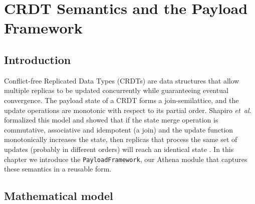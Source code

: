 

\newcommand{\AthenaCode}[2]{\lstset{style=athena, label={#1}, caption={#2}}}


\chapter{CRDT Semantics and the Payload Framework}\label{chap:payload}

\section{Introduction}

Conflict-free Replicated Data Types (CRDTs) are data structures that allow multiple replicas to be updated concurrently while guaranteeing eventual convergence. The payload state of a CRDT forms a join-semilattice, and the update operations are monotonic with respect to its partial order.  Shapiro \emph{et~al.} formalized this model and showed that if the state merge operation is commutative, associative and idempotent (a join) and the update function monotonically increases the state, then replicas that process the same set of updates (probably in different orders) will reach an identical state \cite{shapiro2011conflict}.  In this chapter we introduce the \texttt{PayloadFramework}, our Athena module that captures these semantics in a reusable form.

\section{Mathematical model}\label{sec:payload-math}

